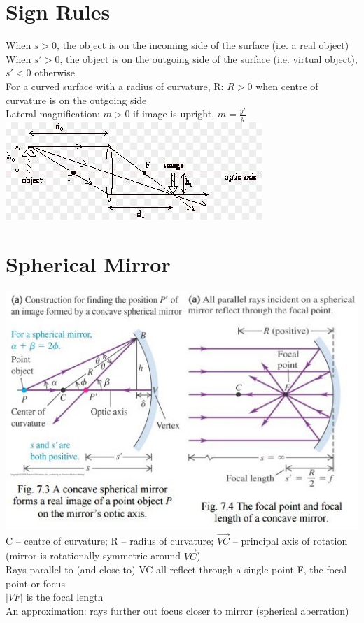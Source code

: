 \documentclass[a4paper, 11pt, fleqn, normalem]{report}
\begin{document}
\section{Sign Rules}
When $s > 0$, the object is on the incoming side of the surface (i.e. a real object) \\
When $s' > 0$, the object is on the outgoing side of the surface (i.e. virtual object), $s' < 0$ otherwise \\
For a curved surface with a radius of curvature, R: $R > 0$ when centre of curvature is on the outgoing side \\
Lateral magnification: $m > 0$ if image is upright, $m = \frac{y'}{y}$ \\
\includegraphics{Lats.jpg}

\section{Spherical Mirror}
\includegraphics{Mirrors.jpg} \\
C -- centre of curvature; R -- radius of curvature; $\overrightarrow{VC}$ -- principal axis of rotation (mirror is rotationally symmetric around $\overrightarrow{VC}$) \\
Rays parallel to (and close to) VC all reflect through a single point F, the focal point or focus \\
$|VF|$ is the focal length \\
An approximation: rays further out focus closer to mirror (spherical aberration)
\end{document}
